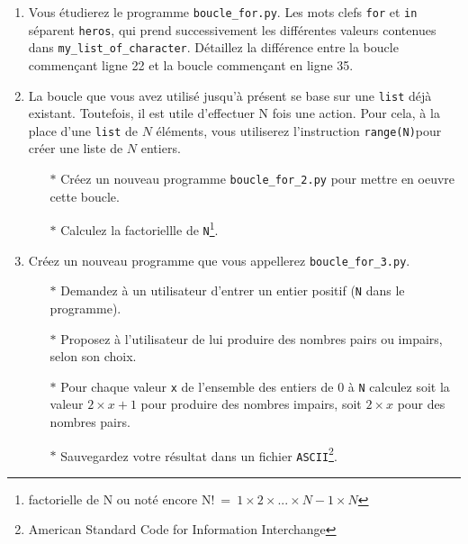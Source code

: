 \begin{enumerate}
\item Vous  étudierez le programme \texttt{boucle\_for.py}.   Les mots
  clefs \texttt{for} et \texttt{in} séparent \texttt{heros}, qui prend
  successivement    les    différentes    valeurs    contenues    dans
  \texttt{my\_list\_of\_character}.  Détaillez la  différence entre la
  boucle commençant ligne 22 et la boucle commençant en ligne 35.

\item La boucle que vous avez  utilisé jusqu'à présent se base sur une
  \texttt{list} déjà existant.  Toutefois,  il est utile d'effectuer N
  fois une  action. Pour cela, à  la place d'une \texttt{list}  de $N$
  éléments, vous utiliserez  l'instruction \texttt{range(N)}pour créer
  une liste de $N$ entiers.
  \begin{itemize}
  \item[$\ast$]  Créez un  nouveau  programme \texttt{boucle\_for\_2.py}  pour
    mettre en oeuvre cette boucle.
  \item[$\ast$] Calculez la factoriellle de \texttt{N}\footnote{factorielle de
    N ou noté encore N!~=~$1 \times 2 \times... \times N-1 \times N$}.
  \end{itemize}


  
\item    Créez   un    nouveau   programme    que   vous    appellerez
  \texttt{boucle\_for\_3.py}.
  \begin{itemize}
  \item[$\ast$]  Demandez   à  un  utilisateur  d'entrer   un  entier  positif
    (\texttt{N} dans le programme).
  \item[$\ast$]  Proposez à  l'utilisateur de lui  produire des  nombres pairs  ou
    impairs, selon son choix.
  \item[$\ast$] Pour chaque valeur \texttt{x} de l'ensemble des entiers de 0
    à \texttt{N} calculez soit la  valeur $2\times x+1$ pour produire
    des nombres impairs, soit $2\times x$ pour des nombres pairs.
  \item[$\ast$]    Sauvegardez     votre    résultat    dans     un    fichier
    \texttt{ASCII}\footnote{American  Standard  Code  for  Information
      Interchange}.
  \end{itemize}

\end{enumerate}




